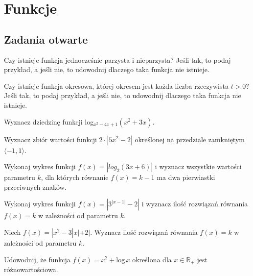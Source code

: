 \setcounter{parc}{0}
\addtocounter{chapc}{1}

\chapter{Funkcje}

\section{Zadania otwarte}

\zadanie Czy istnieje funkcja jednocześnie parzysta i nieparzysta? Jeśli tak, to podaj przykład, a jeśli nie, to udowodnij dlaczego taka funkcja nie istnieje.

\zadanie Czy istnieje funkcja okresowa, której okresem jest każda liczba rzeczywista $t > 0$? Jeśli tak, to podaj przykład, a jeśli nie, to udowodnij dlaczego taka funkcja nie istnieje.

\zadanie Wyznacz dziedzinę funkcji log$_{x^2 - 4x + 1}(x^2 + 3x)$.

\zadanie Wyznacz zbiór wartości funkcji $2\cdot|5x^2 - 2|$ określonej na przedziale zamkniętym $\langle -1, 1 \rangle$.

\zadanie Wykonaj wykres funkcji $f(x) = |log_2(3x + 6)|$ i wyznacz wszystkie wartości parametru $k$, dla których równanie $f(x) = k - 1$ ma dwa pierwiastki przeciwnych znaków.

\zadanie Wykonaj wykres funkcji $f(x) = |3^{|x - 1|} - 2|$ i wyznacz ilość rozwiązań równania $f(x) = k$ w zależności od parametru $k$.

\zadanie Niech $f(x) = |x^2 -3|x| + 2|$. Wyznacz ilość rozwiązań równania $f(x) = k$ w zależności od parametru $k$.

\zadanie Udowodnij, że funkcja $f(x) = x^2 + $log$\,x$ określona dla $x \in \mathbb{R}_+$ jest różnowartościowa.

